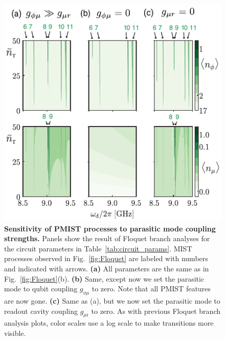 \documentclass[%
reprint,
superscriptaddress,
 amsmath,amssymb,
 aps,
 prx,
longbibliography,
floatfix,
]{revtex4-2}
\begin{document}
\begin{figure}[t]
    \centering
    \includegraphics[width=\linewidth]{Figures/Floquet_coupling.pdf}
    \caption{
        {\bf Sensitivity of PMIST processes to parasitic mode coupling strengths.} Panels show the result of Floquet branch analyses for the circuit parameters in Table~\ref{tab:circuit_params}. MIST processes observed in Fig.~\ref{fig:Floquet} are labeled with numbers and indicated with arrows. \textbf{(a)} All parameters are the same as in Fig.~\ref{fig:Floquet}(b). \textbf{(b)} Same, except now we set the parasitic mode to qubit coupling $g_{\phi \mu}$ to zero. Note that all PMIST features are now gone. \textbf{(c)} Same as (a), but we now set the parasitic mode to readout cavity coupling $g_{\mu \textrm{r}}$ to zero. As with previous Floquet branch analysis plots, color scales use a log scale to make transitions more visible.}
    \label{fig:coupling-Floquet}
\end{figure}
\end{document}
